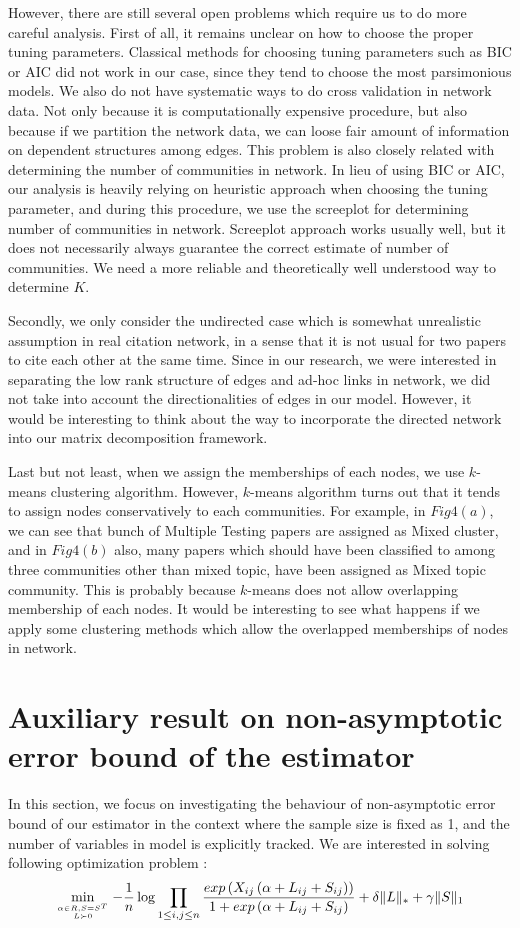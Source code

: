 \documentclass[AMS,STIX1COL]{WileyNJD-v2}
\begin{document}
However, there are still several open problems which require us to do more careful analysis.
First of all, it remains unclear on how to choose the proper tuning parameters.
Classical methods for choosing tuning parameters such as BIC or AIC did not work in our case, since they tend to choose the most parsimonious models.
We also do not have systematic ways to do cross validation in network data.
Not only because it is computationally expensive procedure, but also because if we partition the network data, we can loose fair amount of information on dependent structures among edges.
This problem is also closely related with determining the number of communities in network.
In lieu of using BIC or AIC, our analysis is heavily relying on heuristic approach when choosing the tuning parameter, and during this procedure, we use the screeplot for determining number of communities in network.
Screeplot approach works usually well, but it does not necessarily always guarantee the correct estimate of number of communities.
We need a more reliable and theoretically well understood way to determine $K$.

Secondly, we only consider the undirected case which is somewhat unrealistic assumption in real citation network, in a sense that it is not usual for two papers to cite each other at the same time.
Since in our research, we were interested in separating the low rank structure of edges and ad-hoc links in network, we did not take into account the directionalities of edges in our model.
However, it would be interesting to think about the way to incorporate the directed network into our matrix decomposition framework.

Last but not least, when we assign the memberships of each nodes, we use $k$-means clustering algorithm.
However, $k$-means algorithm turns out that it tends to assign nodes conservatively to each communities.
For example, in $Fig 4 (a)$, we can see that bunch of Multiple Testing papers are assigned as Mixed cluster, and in $Fig 4 (b)$ also, many papers which should have been classified to among three communities other than mixed topic, have been assigned as Mixed topic community.
This is probably because $k$-means does not allow overlapping membership of each nodes.
It would be interesting to see what happens if we apply some clustering methods which allow the overlapped memberships of nodes in network.

\section{Auxiliary result on non-asymptotic error bound of the estimator}
In this section, we focus on investigating the behaviour of non-asymptotic error bound of our estimator in the context where the sample size is fixed as 1, and the number of variables in model is explicitly tracked. We are interested in solving following optimization problem :
\begin{equation}\label{eq:1}
\min\limits_{\alpha \in R, S = S^T \atop L \succ 0}   
-\frac{1}{n} \log \prod_{1\le i,j\le n}\frac{exp\left(X_{ij}\left(\alpha+
L_{ij}+S_{ij}\right)\right)}{1+exp\left(\alpha+
L_{ij}+S_{ij}\right)} + \delta \|L\|_\ast + \gamma \|S\|_1
\end{equation}
\end{document}
